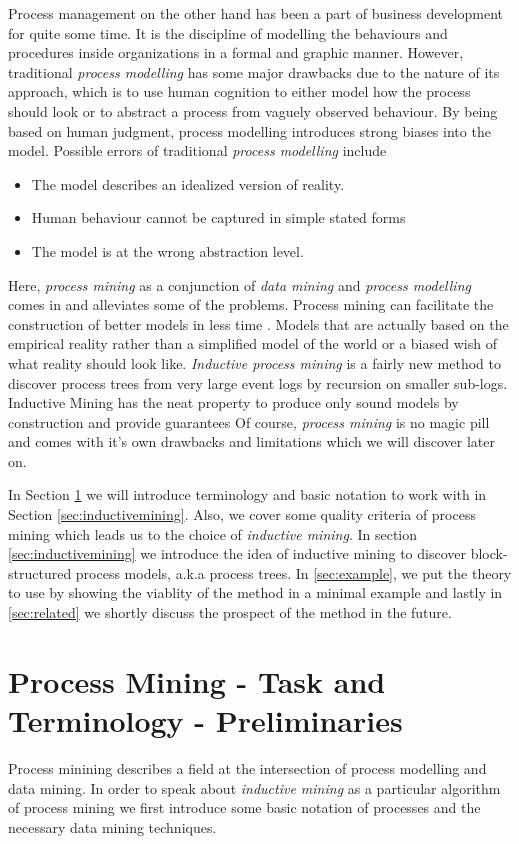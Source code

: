 \documentclass[a4paper]{IEEEtran}
\begin{document}
Process management on the other hand has been a part of business development for quite some time. It is the discipline of modelling the behaviours and procedures inside organizations in a formal and graphic manner. However, traditional \textit{process modelling} has some major drawbacks due to the nature of its approach, which is to use human cognition to either model how the process should look or to abstract a process from vaguely observed behaviour. By being based on human judgment, process modelling introduces strong biases into the model.
Possible errors of traditional \textit{process modelling} include
\begin{itemize}
    \item The model describes an idealized version of reality.
    \item Human behaviour cannot be captured in simple stated forms
    \item The model is at the wrong abstraction level. 
\end{itemize}


Here, \textit{process mining} as a conjunction of \textit{data mining} and \textit{process modelling} comes in and alleviates some of the problems. 
Process mining can facilitate the construction of better models in less time \cite{process_mining}. Models that are actually based on the empirical reality rather than a simplified model of the world or a biased wish of what reality should look like. \textit{Inductive process mining} is a fairly new method to discover process trees from very large event logs by recursion on smaller sub-logs. Inductive Mining has the neat property to produce only sound models by construction and provide guarantees 
Of course, \textit{process mining} is no magic pill and comes with it's own drawbacks and limitations which we will discover later on.


In Section \ref{sec:terminology} we will introduce terminology and basic notation to work with in Section \ref{sec:inductivemining}. Also, we cover some quality criteria of process mining which leads us to the choice of \textit{inductive mining}. In section \ref{sec:inductivemining} we introduce the idea of inductive mining to discover block-structured process models, a.k.a process trees. In \ref{sec:example}, we put the theory to use by showing the viablity of the method in a minimal example and lastly in \ref{sec:related} we shortly discuss the prospect of the method in the future.

\section{Process Mining - Task and Terminology - Preliminaries}
\label{sec:terminology}
Process minining describes a field at the intersection of process modelling and data mining. In order to speak about \textit{inductive mining} as a particular algorithm of process mining we first introduce some basic notation of processes and the necessary data mining techniques. 
\end{document}
